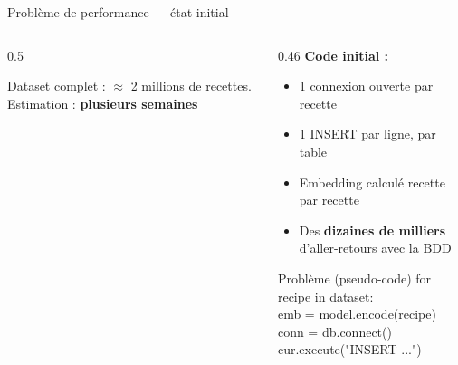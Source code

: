 \documentclass[aspectratio=169]{beamer}
\begin{document}
\begin{frame}{Probl\`eme de performance --- \'etat initial}
\begin{columns}[T]
\begin{column}{0.5\textwidth}
  \begin{center}
  \end{center}
  \vspace{0.3cm}
  \textcolor{cgray}{\footnotesize
    Dataset complet : $\approx$ 2 millions de recettes.
    Estimation : \textbf{plusieurs semaines}
  }
\end{column}
\begin{column}{0.46\textwidth}
  \textbf{Code initial :}
  \vspace{0.2cm}
  \begin{itemize}\footnotesize
    \item[\textcolor{corange}{\textbullet}] 1 connexion ouverte par recette
    \item[\textcolor{corange}{\textbullet}] 1 INSERT par ligne, par table
    \item[\textcolor{corange}{\textbullet}] Embedding calcul\'e recette par recette
    \item[\textcolor{corange}{\textbullet}] Des \textbf{dizaines de milliers} d'aller-retours avec la BDD
  \end{itemize}
  \vspace{0.3cm}
  \begin{block}{\scriptsize Probl\`eme (pseudo-code)}
  \vspace{0.05cm}
  {\ttfamily\scriptsize
  for recipe in dataset:\\
  \quad emb = model.encode(recipe)\\
  \quad conn = db.connect()\\
  \quad cur.execute("INSERT ...")
  }
  \end{block}
\end{column}
\end{columns}
\end{frame}
\end{document}
